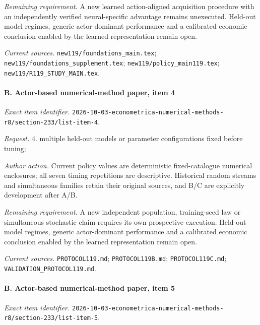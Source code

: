\par\emph{Remaining requirement.} A new learned action-aligned acquisition procedure with an independently verified neural-specific advantage remains unexecuted. Held-out model regimes, generic actor-dominant performance and a calibrated economic conclusion enabled by the learned representation remain open.

\par\emph{Current sources.} \nolinkurl{new119/foundations_main.tex}; \nolinkurl{new119/foundations_supplement.tex}; \nolinkurl{new119/policy_main119.tex}; \nolinkurl{new119/R119_STUDY_MAIN.tex}.

\paragraph{B. Actor-based numerical-method paper, item 4}

\emph{Exact item identifier.} \nolinkurl{2026-10-03-econometrica-numerical-methods-r8/section-233/list-item-4}.

\par\emph{Request.} 4. multiple held-out models or parameter configurations fixed before tuning;

\par\emph{Author action.} Current policy values are deterministic fixed-catalogue numerical enclosures; all seven timing repetitions are descriptive. Historical random streams and simultaneous families retain their original sources, and B/\allowbreak{}C are explicitly development after A/\allowbreak{}B.

\par\emph{Remaining requirement.} A new independent population, training-seed law or simultaneous stochastic claim requires its own prospective execution. Held-out model regimes, generic actor-dominant performance and a calibrated economic conclusion enabled by the learned representation remain open.

\par\emph{Current sources.} \nolinkurl{PROTOCOL119.md}; \nolinkurl{PROTOCOL119B.md}; \nolinkurl{PROTOCOL119C.md}; \nolinkurl{VALIDATION_PROTOCOL119.md}.

\paragraph{B. Actor-based numerical-method paper, item 5}

\emph{Exact item identifier.} \nolinkurl{2026-10-03-econometrica-numerical-methods-r8/section-233/list-item-5}.

